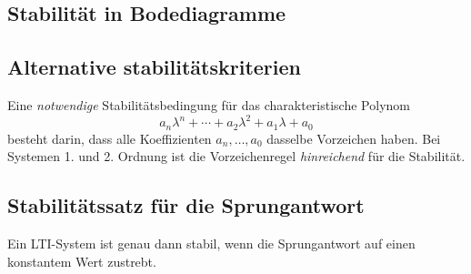% 

\subsection{Stabilit\"at in Bodediagramme }

\subsection{Alternative stabilit\"atskriterien }

Eine \emph{notwendige} Stabilit\"atsbedingung f\"ur das charakteristische Polynom
\[
	a_n \lambda^n + \cdots + a_2 \lambda^2 + a_1 \lambda + a_0
\]
besteht darin, dass alle Koeffizienten \(a_n, \ldots, a_0\) dasselbe Vorzeichen haben.
Bei Systemen 1. und 2. Ordnung ist die Vorzeichenregel \emph{hinreichend} f\"ur die Stabilit\"at.

\subsection{Stabilitätssatz für die Sprungantwort}
Ein LTI-System ist genau dann stabil, wenn die Sprungantwort auf einen konstantem Wert zustrebt.
